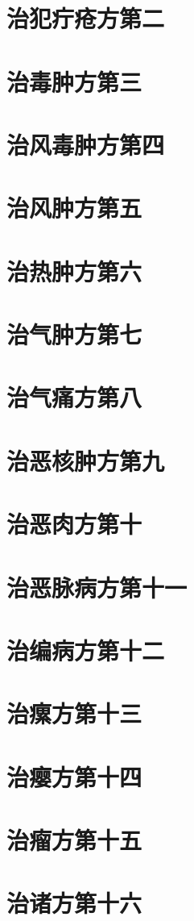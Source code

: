 \documentclass[a4paper,12pt,UTF8,twoside]{ctexbook}
\begin{document}
\chapter{治犯疔疮方第二}
\chapter{治毒肿方第三}
\chapter{治风毒肿方第四}
\chapter{治风肿方第五}
\chapter{治热肿方第六}
\chapter{治气肿方第七}
\chapter{治气痛方第八}
\chapter{治恶核肿方第九}
\chapter{治恶肉方第十}
\chapter{治恶脉病方第十一}
\chapter{治编病方第十二}
\chapter{治瘰方第十三}
\chapter{治瘿方第十四}
\chapter{治瘤方第十五}
\chapter{治诸方第十六}
\end{document}
